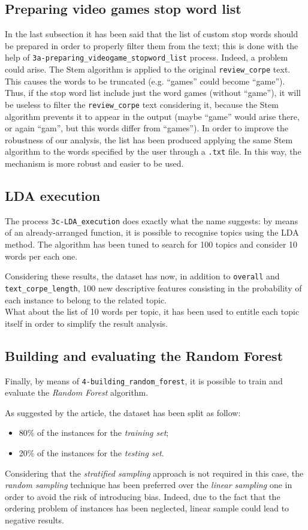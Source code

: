 \documentclass[a4paper]{article}
\begin{document}
 		\subsection{Preparing video games stop word list}
		 	In the last subsection it has been said that the list of custom stop words should be prepared in order to properly filter them from the text; this is done with the help of \verb*|3a-preparing_videogame_stopword_list| process.
		 	Indeed, a problem could arise. The Stem algorithm is applied to the original \verb*|review_corpe| text. This causes the words to be truncated (e.g. ``games'' could become ``game''). Thus, if the stop word list include just the word games (without ``game''), it will be useless to filter the \verb*|review_corpe| text considering it, because the Stem algorithm prevents it to appear in the output (maybe ``game'' would arise there, or again ``gam'', but this words differ from ``games''). In order to improve the robustness of our analysis, the list has been produced applying the same Stem algorithm to the words specified by the user through a \verb*|.txt| file. In this way, the mechanism is more robust and easier to be used.
		 	
		 \subsection{LDA execution}
		 	The process \verb*|3c-LDA_execution| does exactly what the name suggests: by means of an already-arranged function, it is possible to recognise topics using the LDA method. The algorithm has been tuned to search for 100 topics and consider 10 words per each one.
		 	
		 	Considering these results, the dataset has now, in addition to \verb*|overall| and \verb*|text_corpe_length|, 100 new descriptive features consisting in the probability of each instance to belong to the related topic.\\
		 	What about the list of 10 words per topic, it has been used to entitle each topic itself in order to simplify the result analysis.
		 	
		 \subsection{Building and evaluating the Random Forest}
		 	Finally, by means of \verb*|4-building_random_forest|, it is possible to train and evaluate the \emph{Random Forest} algorithm. 
		 	
		 	As suggested by the article, the dataset has been split as follow:
		 	\begin{itemize}
			 	\item 80\% of the instances for the \emph{training set};
			 	\item 20\% of the instances for the \emph{testing set}.
		 	\end{itemize}
	 		Considering that the \emph{stratified sampling} approach is not required in this case, the \emph{random sampling} technique has been preferred over the \emph{linear sampling} one in order to avoid the risk of introducing bias. Indeed, due to the fact that the ordering problem of instances has been neglected, linear sample could lead to negative results.
	 		
\end{document}
